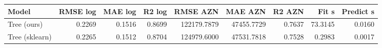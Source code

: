 \begin{tabular}{lrrrrrrrr}
\toprule
Model & RMSE log & MAE log & R2 log & RMSE AZN & MAE AZN & R2 AZN & Fit s & Predict s \\
\midrule
Tree (ours) & 0.2269 & 0.1516 & 0.8699 & 122179.7879 & 47455.7729 & 0.7637 & 73.3145 & 0.0160 \\
Tree (sklearn) & 0.2265 & 0.1512 & 0.8704 & 124979.6000 & 47531.7818 & 0.7528 & 0.2983 & 0.0017 \\
\bottomrule
\end{tabular}
